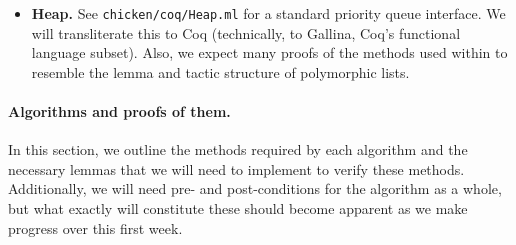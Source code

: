 \documentclass{article}
\begin{document}
\begin{itemize}
  \item \textbf{Heap.}
    See \verb`chicken/coq/Heap.ml` for a standard priority queue interface.
    We will transliterate this to Coq (technically, to Gallina, Coq's
    functional language subset).
    Also, we expect many proofs of the methods used within to resemble
    the lemma and tactic structure of polymorphic lists.

\end{itemize}

\paragraph{Algorithms and proofs of them.}
In this section, we outline the methods required by each algorithm and
the necessary lemmas that we will need to implement to verify these
methods. Additionally, we will need pre- and post-conditions for the
algorithm as a whole, but what exactly will constitute these should become
apparent as we make progress over this first week.
\end{document}
